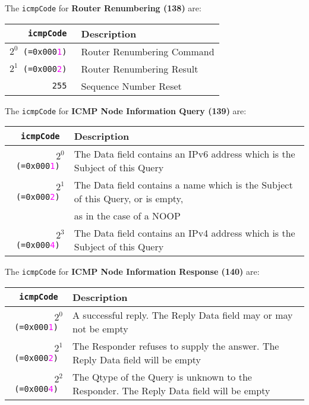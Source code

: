 \documentclass[documentation]{subfiles}
\begin{document}
The {\tt icmpCode} for {\bf Router Renumbering (138)} are:
\begin{longtable}{>{\tt}rl}
    \toprule
    {\bf icmpCode} & {\bf Description}\\
    \midrule\endhead%
    $2^{0}$ (=0x000\textcolor{magenta}{1}) & Router Renumbering Command\\
    $2^{1}$ (=0x000\textcolor{magenta}{2}) & Router Renumbering Result\\
    255 & Sequence Number Reset\\
    \bottomrule
\end{longtable}

The {\tt icmpCode} for {\bf ICMP Node Information Query (139)} are:
\begin{longtable}{>{\tt}rl}
    \toprule
    {\bf icmpCode} & {\bf Description}\\
    \midrule\endhead%
    $2^{0}$ (=0x000\textcolor{magenta}{1}) & The Data field contains an IPv6 address which is the Subject of this Query\\
    $2^{1}$ (=0x000\textcolor{magenta}{2}) & The Data field contains a name which is the Subject of this Query, or is empty,\\
                                           & as in the case of a NOOP\\
    $2^{3}$ (=0x000\textcolor{magenta}{4}) & The Data field contains an IPv4 address which is the Subject of this Query\\
    \bottomrule
\end{longtable}

The {\tt icmpCode} for {\bf ICMP Node Information Response (140)} are:
\begin{longtable}{>{\tt}rl}
    \toprule
    {\bf icmpCode} & {\bf Description}\\
    \midrule\endhead%
    $2^{0}$ (=0x000\textcolor{magenta}{1}) & A successful reply. The Reply Data field may or may not be empty\\
    $2^{1}$ (=0x000\textcolor{magenta}{2}) & The Responder refuses to supply the answer. The Reply Data field will be empty\\
    $2^{2}$ (=0x000\textcolor{magenta}{4}) & The Qtype of the Query is unknown to the Responder. The Reply Data field will be empty\\
    \bottomrule
\end{longtable}
\end{document}
